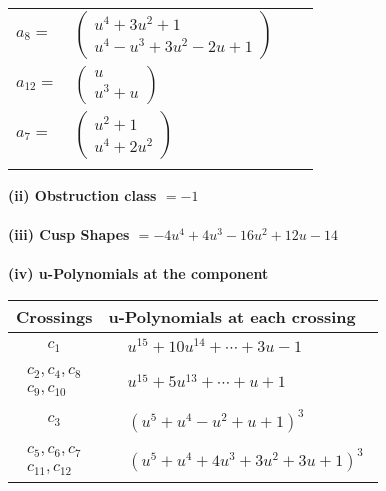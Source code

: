 \documentclass[1p]{elsarticle_modified}
\theoremstyle{definition}
\begin{document}
\begin{tabular}{m{7pt} m{180pt} m{7pt} m{180pt} }
\flushright $a_{8}=$&$\begin{pmatrix}u^4+3 u^2+1\\u^4- u^3+3 u^2-2 u+1\end{pmatrix}$ \\
\flushright $a_{12}=$&$\begin{pmatrix}u\\u^3+u\end{pmatrix}$ \\
\flushright $a_{7}=$&$\begin{pmatrix}u^2+1\\u^4+2 u^2\end{pmatrix}$\\&\end{tabular}
\flushleft \textbf{(ii) Obstruction class $= -1$}\\~\\
\flushleft \textbf{(iii) Cusp Shapes $= -4 u^4+4 u^3-16 u^2+12 u-14$}\\~\\
\newpage\renewcommand{\arraystretch}{1}
\flushleft \textbf{(iv) u-Polynomials at the component}\newline \\
\begin{tabular}{m{50pt}|m{274pt}}
Crossings & \hspace{64pt}u-Polynomials at each crossing \\
\hline $$\begin{aligned}c_{1}\end{aligned}$$&$\begin{aligned}
&u^{15}+10 u^{14}+\cdots+3 u-1
\end{aligned}$\\
\hline $$\begin{aligned}c_{2},c_{4},c_{8}\\c_{9},c_{10}\end{aligned}$$&$\begin{aligned}
&u^{15}+5 u^{13}+\cdots+u+1
\end{aligned}$\\
\hline $$\begin{aligned}c_{3}\end{aligned}$$&$\begin{aligned}
&(u^5+u^4- u^2+u+1)^3
\end{aligned}$\\
\hline $$\begin{aligned}c_{5},c_{6},c_{7}\\c_{11},c_{12}\end{aligned}$$&$\begin{aligned}
&(u^5+u^4+4 u^3+3 u^2+3 u+1)^3
\end{aligned}$\\
\hline
\end{tabular}\\~\\
\end{document}
